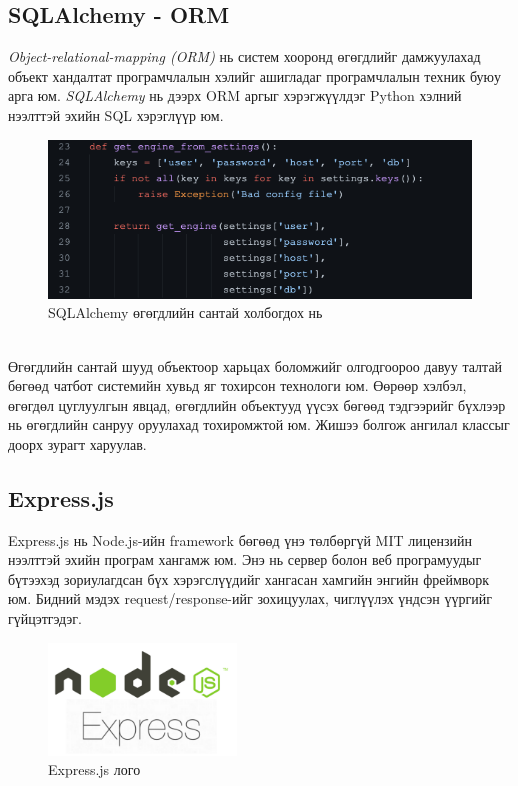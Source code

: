 \subsection{SQLAlchemy - ORM}
\textit{Object-relational-mapping (ORM)} нь систем хооронд өгөгдлийг дамжуулахад объект хандалтат програмчлалын хэлийг ашигладаг програмчлалын техник буюу арга юм. \textit{SQLAlchemy} нь дээрх ORM аргыг хэрэгжүүлдэг Python хэлний нээлттэй эхийн SQL хэрэглүүр юм. 
\begin{figure}[ht]
  \centering
  \includegraphics[height=5  cm]{images/connection.png}
  \caption{SQLAlchemy өгөгдлийн сантай холбогдох нь} \label{fig:connection}
\end{figure}
\\Өгөгдлийн сантай шууд объектоор харьцах боломжийг олгодгоороо давуу талтай бөгөөд чатбот системийн хувьд яг тохирсон технологи юм. Өөрөөр хэлбэл, өгөгдөл цуглуулгын явцад, өгөгдлийн объектууд үүсэх бөгөөд тэдгээрийг бүхлээр нь өгөгдлийн санруу оруулахад тохиромжтой юм. Жишээ болгож ангилал классыг доорх зурагт харуулав.
 
\subsection{Express.js}
Express.js нь Node.js-ийн framework бөгөөд үнэ төлбөргүй MIT лицензийн нээлттэй эхийн програм хангамж юм. Энэ нь сервер болон веб програмуудыг бүтээхэд зориулагдсан бүх хэрэгслүүдийг хангасан хамгийн энгийн фреймворк юм. Бидний мэдэх request/response-ийг зохицуулах, чиглүүлэх үндсэн үүргийг гүйцэтгэдэг.
\begin{figure}[ht]
  \centering
  \includegraphics[width=5cm]{images/expressJs.png}
  \caption{Express.js лого} \label{fig:expressjs}
\end{figure}
